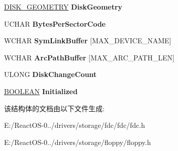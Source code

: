 \begin{DoxyCompactItemize}
\hyperlink{struct___d_i_s_k___g_e_o_m_e_t_r_y}{D\+I\+S\+K\+\_\+\+G\+E\+O\+M\+E\+T\+RY} {\bfseries Disk\+Geometry}
\item 
\mbox{\label{struct___d_r_i_v_e___i_n_f_o_a8028b3654a69880b00a5b5b8ca53f49d}} 
U\+C\+H\+AR {\bfseries Bytes\+Per\+Sector\+Code}
\item 
\mbox{\label{struct___d_r_i_v_e___i_n_f_o_a1147049aa5f1ede9bdb560b8cef91478}} 
W\+C\+H\+AR {\bfseries Sym\+Link\+Buffer} \mbox{[}M\+A\+X\+\_\+\+D\+E\+V\+I\+C\+E\+\_\+\+N\+A\+ME\mbox{]}
\item 
\mbox{\label{struct___d_r_i_v_e___i_n_f_o_a10611217e796f8ab8b0184e992871f1b}} 
W\+C\+H\+AR {\bfseries Arc\+Path\+Buffer} \mbox{[}M\+A\+X\+\_\+\+A\+R\+C\+\_\+\+P\+A\+T\+H\+\_\+\+L\+EN\mbox{]}
\item 
\mbox{\label{struct___d_r_i_v_e___i_n_f_o_a5612cd5fbfedc25390c5fd3cee2fb33d}} 
U\+L\+O\+NG {\bfseries Disk\+Change\+Count}
\item 
\mbox{\label{struct___d_r_i_v_e___i_n_f_o_a8f71fed4f5b763697c4dc0351b6d9c51}} 
\hyperlink{_processor_bind_8h_a112e3146cb38b6ee95e64d85842e380a}{B\+O\+O\+L\+E\+AN} {\bfseries Initialized}
\end{DoxyCompactItemize}


该结构体的文档由以下文件生成\+:\begin{DoxyCompactItemize}
\item 
E\+:/\+React\+O\+S-\/0../drivers/storage/fdc/fdc/fdc.\+h\item 
E\+:/\+React\+O\+S-\/0../drivers/storage/floppy/floppy.\+h\end{DoxyCompactItemize}
